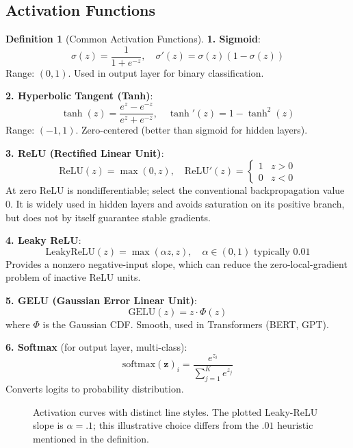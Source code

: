 \documentclass[11pt,twoside]{article}
\numberwithin{equation}{section}
\newcommand{\vect}[1]{\bm{#1}}
\theoremstyle{plain}
\theoremstyle{definition}
\newtheorem{definition}[theorem]{Definition}
\theoremstyle{remark}
\begin{document}
\subsection{Activation Functions}

\begin{definition}[Common Activation Functions]

\textbf{1. Sigmoid}:
\[
\sigma(z) = \frac{1}{1 + e^{-z}}, \quad \sigma'(z) = \sigma(z)(1-\sigma(z))
\]
Range: $(0, 1)$. Used in output layer for binary classification.

\textbf{2. Hyperbolic Tangent (Tanh)}:
\[
\tanh(z) = \frac{e^z - e^{-z}}{e^z + e^{-z}}, \quad \tanh'(z) = 1 - \tanh^2(z)
\]
Range: $(-1, 1)$. Zero-centered (better than sigmoid for hidden layers).

\textbf{3. ReLU (Rectified Linear Unit)}:
\[
\text{ReLU}(z) = \max(0, z), \quad \text{ReLU}'(z) = \begin{cases} 1 & z > 0 \\ 0 & z < 0 \end{cases}
\]
At zero ReLU is nondifferentiable; select the conventional backpropagation value 0. It is widely used in hidden layers and avoids saturation on its positive branch, but does not by itself guarantee stable gradients.

\textbf{4. Leaky ReLU}:
\[
\text{LeakyReLU}(z) = \max(\alpha z, z), \quad \alpha \in (0, 1) \text{ typically } 0.01
\]
Provides a nonzero negative-input slope, which can reduce the zero-local-gradient problem of inactive ReLU units.

\textbf{5. GELU (Gaussian Error Linear Unit)}:
\[
\text{GELU}(z) = z \cdot \Phi(z)
\]
where $\Phi$ is the Gaussian CDF. Smooth, used in Transformers (BERT, GPT).

\textbf{6. Softmax} (for output layer, multi-class):
\[
\text{softmax}(\vect{z})_i = \frac{e^{z_i}}{\sum_{j=1}^K e^{z_j}}
\]
Converts logits to probability distribution.
\end{definition}

\begin{figure}[H]
\centering
{}
\caption{Activation curves with distinct line styles. The plotted Leaky-ReLU slope is $\alpha=.1$; this illustrative choice differs from the $.01$ heuristic mentioned in the definition.}
\end{figure}
\end{document}
